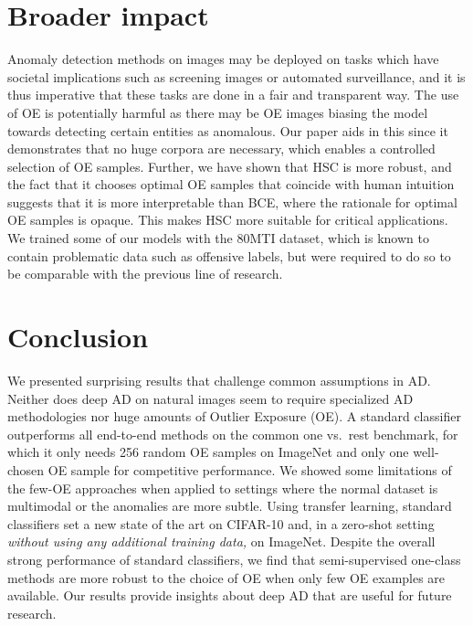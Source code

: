 \documentclass[10pt]{article} \usepackage[accepted]{stylefiles/tmlr}
\begin{document}
\section{Broader impact} \label{sec:ethics}
Anomaly detection methods on images may be deployed on tasks which have societal implications such as screening images or automated surveillance, and it is thus imperative that these tasks are done in a fair and transparent way. 
The use of OE is potentially harmful as there may be OE images biasing the model towards detecting certain entities as anomalous. 
Our paper aids in this since it demonstrates that no huge corpora are necessary, which enables a controlled selection of OE samples. 
Further, we have shown that HSC is more robust, and the fact that it chooses optimal OE samples that coincide with human intuition suggests that it is more interpretable than BCE, where the rationale for optimal OE samples is opaque. 
This makes HSC more suitable for critical applications. 
We trained some of our models with the 80MTI dataset, which is known to contain problematic data such as offensive labels, but were required to do so to be comparable with the previous line of research.


\section{Conclusion}
\label{sec:disc}
We presented surprising results that challenge common assumptions in AD. 
Neither does deep AD on natural images seem to require specialized AD methodologies nor huge amounts of Outlier Exposure (OE).
A standard classifier outperforms all end-to-end methods on the common one vs.~rest benchmark, for which it only needs 256 random OE samples on ImageNet and only one well-chosen OE sample for competitive performance. 
We showed some limitations of the few-OE approaches when applied to settings where the normal dataset is multimodal or the anomalies are more subtle. 
Using transfer learning, standard classifiers set a new state of the art on CIFAR-10 and, in a zero-shot setting \emph{without using any additional training data,} on ImageNet. 
Despite the overall strong performance of standard classifiers, we find that semi-supervised one-class methods are more robust to the choice of OE when only few OE examples are available.
Our results provide insights about deep AD that are useful for future research.
\end{document}
